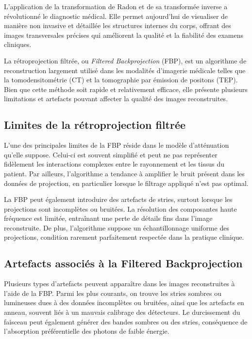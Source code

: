 L'application de la transformation de Radon et de sa transformée inverse a révolutionné le diagnostic médical. Elle permet aujourd'hui de visualiser de manière non invasive et détaillée les structures internes du corps, offrant des images transversales précises qui améliorent la qualité et la fiabilité des examens cliniques.

La rétroprojection filtrée, ou \emph{Filtered Backprojection} (FBP), est un algorithme de reconstruction largement utilisé dans les modalités d'imagerie médicale telles que la tomodensitométrie (CT) et la tomographie par émission de positons (TEP). Bien que cette méthode soit rapide et relativement efficace, elle présente plusieurs limitations et artefacts pouvant affecter la qualité des images reconstruites.

\subsection{Limites de la rétroprojection filtrée}

L'une des principales limites de la FBP réside dans le modèle d'atténuation qu'elle suppose. Celui-ci est souvent simplifié et peut ne pas représenter fidèlement les interactions complexes entre le rayonnement et les tissus du patient. Par ailleurs, l'algorithme a tendance à amplifier le bruit présent dans les données de projection, en particulier lorsque le filtrage appliqué n'est pas optimal. 

La FBP peut également introduire des artefacts de stries, surtout lorsque les projections sont incomplètes ou bruitées. La résolution des composantes haute fréquence est limitée, entraînant une perte de détails fins dans l'image reconstruite. De plus, l'algorithme suppose un échantillonnage uniforme des projections, condition rarement parfaitement respectée dans la pratique clinique.

\subsection{Artefacts associés à la Filtered Backprojection}

Plusieurs types d'artefacts peuvent apparaître dans les images reconstruites à l'aide de la FBP. Parmi les plus courants, on trouve les stries sombres ou lumineuses dues à des données incomplètes ou bruitées, ainsi que les artefacts en anneau, souvent liés à un mauvais calibrage des détecteurs. Le durcissement du faisceau peut également générer des bandes sombres ou des stries, conséquence de l'absorption préférentielle des photons de faible énergie.  

